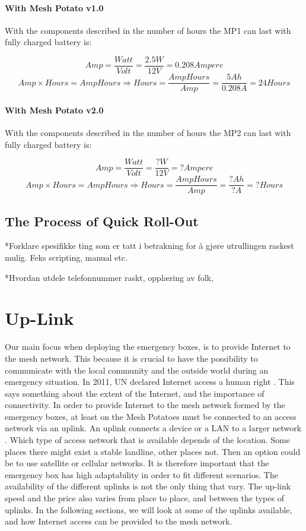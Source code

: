 \paragraph{With Mesh Potato v1.0}
With the components described in  the number of hours the MP1 can last with fully charged battery is: 

$$Amp = \frac{Watt}{Volt} = \frac{2.5 W}{12 V} = 0.208 Ampere$$
$$Amp\times Hours = AmpHours \Rightarrow Hours = \frac{AmpHours}{Amp} = \frac{5 Ah}{0.208 A} = 24 Hours$$

\paragraph{With Mesh Potato v2.0}
With the components described in  the number of hours the MP2 can last with fully charged battery is: 

$$Amp = \frac{Watt}{Volt} = \frac{? W}{12 V} = ? Ampere$$
$$Amp\times Hours = AmpHours \Rightarrow Hours = \frac{AmpHours}{Amp} = \frac{? Ah}{? A} = ? Hours$$

\subsection{The Process of Quick Roll-Out}
*Forklare spesifikke ting som er tatt i betrakning for å gjøre utrullingen raskest mulig. Feks scripting, manual etc. 

*Hvordan utdele telefonnummer raskt, opplæring av folk, 


\section{Up-Link}
Our main focus when deploying the emergency boxes, is to provide Internet to the mesh network. This because it is crucial to have the possibility to communicate with the local community and the outside world during an emergency situation. In 2011, UN declared Internet access a human right \cite{HR}. This says something about the extent of the Internet, and the importance of connectivity. In order to provide Internet to the mesh network formed by the emergency boxes, at least on the Mesh Potatoes must be connected to an access network via an uplink. An uplink connects a device or a LAN to a larger network \cite{uplink}. Which type of access network that is available depends of the location. Some places there might exist a stable landline, other places not. Then an option could be to use satellite or cellular networks. It is therefore important that the emergency box has high adaptability in order to fit different scenarios. The availability of the different uplinks is not the only thing that vary. The up-link speed and the price also varies from place to place, and between the types of uplinks. In the following sections, we will look at some of the uplinks available, and how Internet access can be provided to the mesh network.  

